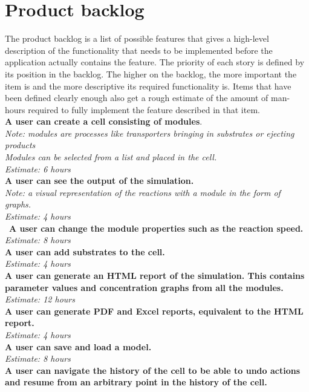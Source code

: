 \documentclass[10pt,a4paper]{report}
\begin{document}
	\section{Product backlog}
		The product backlog is a list of possible features that gives a high-level description of the functionality that needs to be implemented before the application actually contains the feature. The priority of each story is defined by its position in the backlog. The higher on the backlog, the more important the item is and the more descriptive its required functionality is. Items that have been defined clearly enough also get a rough estimate of the amount of man-hours required to fully implement the feature described in that item.
		\\
		\textbf{A user can create a cell consisting of modules}. \\
		\indent
			\textit{Note: modules are processes like transporters bringing in substrates or ejecting products\\
		\indent
			Modules can be selected from a list and placed in the cell.\\
		\indent
			Estimate: 6 hours} \\
		\textbf{A user can see the output of the simulation. }\\
		\indent
			\textit{Note: a visual representation of the reactions with a module in the form of graphs. \\
		\indent
			Estimate: 4 hours} \\\
		\textbf{A user can change the module properties such as the reaction speed.} \\
		\indent
			\emph{Estimate: 8 hours} \\
		\textbf{A user can add substrates to the cell.} \\
		\indent
			\emph{Estimate: 4 hours} \\
		\textbf{A user can generate an HTML report of the simulation. This contains parameter values and concentration graphs from all the modules.} \\
		\indent
			\emph{ Estimate: 12 hours} \\
		\textbf{A user can generate PDF and Excel reports, equivalent to the HTML report.} \\
		\indent
			\emph{Estimate: 4 hours} \\
		\textbf{A user can save and load a model.} \\
		\indent
			\emph{Estimate: 8 hours} \\
		\textbf{A user can navigate the history of the cell to be able to undo actions and resume from an arbitrary point in the history of the cell.}\\
\end{document}
